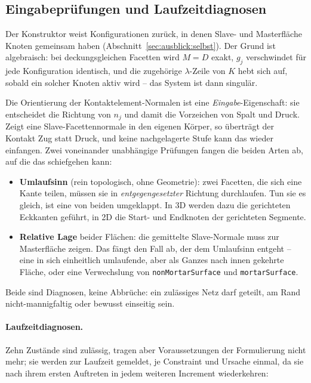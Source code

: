 \documentclass[a4paper,11pt]{article}
\def\bm#1{#1}%
\def\tilde#1{#1}%
\newcommand{\code}[1]{\texttt{\small #1}}
\begin{document}
\subsection{Eingabeprüfungen und Laufzeitdiagnosen}
Der Konstruktor weist Konfigurationen zurück, in denen Slave- und Masterfläche Knoten gemeinsam
haben (Abschnitt~\ref{sec:ausblick:selbst}). Der Grund ist algebraisch: bei deckungsgleichen
Facetten wird $\bm M=\bm D$ exakt, $\tilde g_j$ verschwindet für jede Konfiguration identisch, und
die zugehörige $\lambda$-Zeile von $\bm K$ hebt sich auf, sobald ein solcher Knoten aktiv wird --
das System ist dann singulär.

Die Orientierung der Kontaktelement-Normalen ist eine \emph{Eingabe}-Eigenschaft: sie entscheidet
die Richtung von $\bm n_j$ und damit die Vorzeichen von Spalt und Druck. Zeigt eine
Slave-Facettennormale in den eigenen Körper, so überträgt der Kontakt Zug statt Druck, und keine
nachgelagerte Stufe kann das wieder einfangen. Zwei voneinander unabhängige Prüfungen fangen die
beiden Arten ab, auf die das schiefgehen kann:

\begin{itemize}\itemsep2pt
  \item \textbf{Umlaufsinn} (rein topologisch, ohne Geometrie): zwei Facetten, die sich eine Kante
        teilen, müssen sie in \emph{entgegengesetzter} Richtung durchlaufen. Tun sie es gleich, ist
        eine von beiden umgeklappt. In 3D werden dazu die gerichteten Eckkanten geführt, in 2D die
        Start- und Endknoten der gerichteten Segmente.
  \item \textbf{Relative Lage} beider Flächen: die gemittelte Slave-Normale muss zur Masterfläche
        zeigen. Das fängt den Fall ab, der dem Umlaufsinn entgeht -- eine in sich einheitlich
        umlaufende, aber als Ganzes nach innen gekehrte Fläche, oder eine Verwechslung von
        \code{nonMortarSurface} und \code{mortarSurface}.
\end{itemize}

\noindent Beide sind Diagnosen, keine Abbrüche: ein zulässiges Netz darf geteilt, am Rand
nicht-mannigfaltig oder bewusst einseitig sein.

\paragraph{Laufzeitdiagnosen.}
Zehn Zustände sind zulässig, tragen aber Voraussetzungen der Formulierung nicht mehr; sie werden
zur Laufzeit gemeldet, je Constraint und Ursache einmal, da sie nach ihrem ersten Auftreten in
jedem weiteren Increment wiederkehren:
\end{document}
